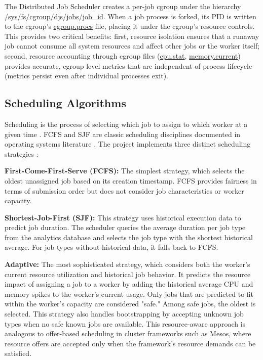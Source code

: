 The Distributed Job Scheduler creates a per-job cgroup under the hierarchy \url{/sys/fs/cgroup/djs/jobs/job_id}. When a job process is forked, its PID is written to the cgroup's \url{cgroup.procs} file, placing it under the cgroup's resource controls. This provides two critical benefits: first, resource isolation ensures that a runaway job cannot consume all system resources and affect other jobs or the worker itself; second, resource accounting through cgroup files (\url{cpu.stat}, \url{memory.current}) provides accurate, cgroup-level metrics that are independent of process lifecycle (metrics persist even after individual processes exit).

\subsection{Scheduling Algorithms}

Scheduling is the process of selecting which job to assign to which worker at a given time \cite{zaharia2016spark}. FCFS and SJF are classic scheduling disciplines documented in operating systems literature \cite{silberschatz2018osc}. The project implements three distinct scheduling strategies \cite{richards2020architecture}:

\textbf{First-Come-First-Serve (FCFS):} The simplest strategy, which selects the oldest unassigned job based on its creation timestamp. FCFS provides fairness in terms of submission order but does not consider job characteristics or worker capacity.

\textbf{Shortest-Job-First (SJF):} This strategy uses historical execution data to predict job duration. The scheduler queries the average duration per job type from the analytics database and selects the job type with the shortest historical average. For job types without historical data, it falls back to FCFS.

\textbf{Adaptive:} The most sophisticated strategy, which considers both the worker's current resource utilization and historical job behavior. It predicts the resource impact of assigning a job to a worker by adding the historical average CPU and memory spikes to the worker's current usage. Only jobs that are predicted to fit within the worker's capacity are considered "safe." Among safe jobs, the oldest is selected. This strategy also handles bootstrapping by accepting unknown job types when no safe known jobs are available. This resource-aware approach is analogous to offer-based scheduling in cluster frameworks such as Mesos, where resource offers are accepted only when the framework's resource demands can be satisfied.

